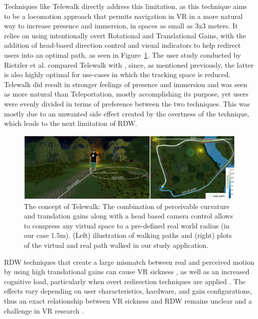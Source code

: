 Techniques like Telewalk \cite{Rietzler2020} directly address this limitation, 
as this technique aims to be a locomotion approach that permits navigation in VR in a more natural way to increase presence and immersion, in 
spaces as small as 3x3 meters. It relies on using intentionally overt Rotational and Translational Gains, with the addition of head-based direction 
control and visual indicators to help redirect users into an optimal path, as seen in Figure~\ref{fig:rdw-telewalk}. The user study conducted 
by Rietzler et al. \cite{Rietzler2020} compared Telewalk with , since, as mentioned previously, the latter is also highly 
optimal for use-cases in which the tracking space is reduced. Telewalk did result in stronger feelings of presence and immersion and was 
seen as more natural than Teleportation, mostly accomplishing its purpose, yet users were evenly divided in terms of preference between the two 
techniques. This was mostly due to an unwanted side effect created by the overtness of the technique, which leads to the next limitation of 
\gls{RDW}.

\begin{figure}[b]
    \centering
    \includegraphics[width=\textwidth]{NOVAthesisFiles/Images/papers/rdw-telewalk.png}
    \caption{The concept of Telewalk: The combination of perceivable curvature and translation gains along with a head based camera
    control allows to compress any virtual space to a pre-defined real world radius (in our case 1.5m). (Left) illustration of walking paths
    and (right) plots of the virtual and real path walked in our study application. \cite{Rietzler2020}}
    \label{fig:rdw-telewalk}
\end{figure}

\gls{RDW} techniques that create a large mismatch between real and perceived motion by using high translational gains 
can cause \gls{VR} sickness \cite{Gemert2024}, as well as an increased cognitive load, particularly when overt redirection techniques 
are applied \cite{8255772}. The effects vary depending on user characteristics, hardware, and gain configurations, thus 
an exact relationship between \gls{VR} sickness and \gls{RDW} remains unclear and a challenge in \gls{VR} research \cite{Gemert2024, Grechkin2016}.

